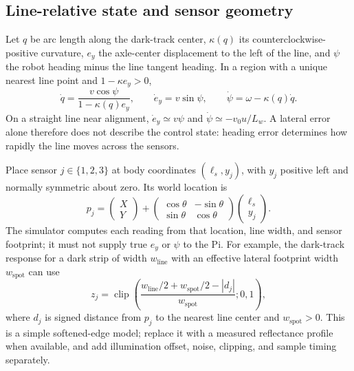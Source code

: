 \subsection{Line-relative state and sensor geometry}
Let $q$ be arc length along the dark-track center, $\kappa(q)$ its counterclockwise-positive curvature, $e_y$ the axle-center displacement to the left of the line, and $\psi$ the robot heading minus the line tangent heading. In a region with a unique nearest line point and $1-\kappa e_y>0$,
\begin{equation}
 \dot q=\frac{v\cos\psi}{1-\kappa(q)e_y},\qquad
 \dot e_y=v\sin\psi,\qquad
 \dot\psi=\omega-\kappa(q)\dot q.
 \label{eq:line-relative-motion}
\end{equation}
On a straight line near alignment, $\dot e_y\simeq v\psi$ and $\dot\psi\simeq-v_0u/L_w$. A lateral error alone therefore does not describe the control state: heading error determines how rapidly the line moves across the sensors.

Place sensor $j\in\{1,2,3\}$ at body coordinates $(\ell_s,y_j)$, with $y_j$ positive left and normally symmetric about zero. Its world location is
\begin{equation}
 p_j=\begin{pmatrix}X\\Y\end{pmatrix}
 +\begin{pmatrix}\cos\theta&-\sin\theta\\\sin\theta&\cos\theta\end{pmatrix}
  \begin{pmatrix}\ell_s\\y_j\end{pmatrix}.
 \label{eq:sensor-location}
\end{equation}
The simulator computes each reading from that location, line width, and sensor footprint; it must not supply true $e_y$ or $\psi$ to the Pi. For example, the dark-track response for a dark strip of width $w_{\mathrm{line}}$ with an effective lateral footprint width $w_{\mathrm{spot}}$ can use
\begin{equation}
 z_j=\operatorname{clip}\!\left(
  \frac{w_{\mathrm{line}}/2+w_{\mathrm{spot}}/2-|d_j|}{w_{\mathrm{spot}}};0,1\right),
 \label{eq:reflectance-model}
\end{equation}
where $d_j$ is signed distance from $p_j$ to the nearest line center and $w_{\mathrm{spot}}>0$. This is a simple softened-edge model; replace it with a measured reflectance profile when available, and add illumination offset, noise, clipping, and sample timing separately.

